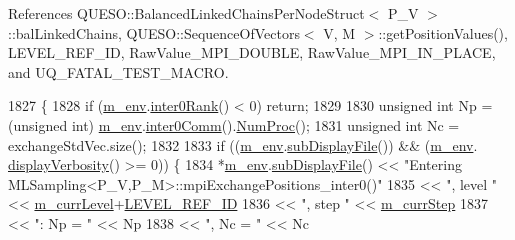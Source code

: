 References Q\-U\-E\-S\-O\-::\-Balanced\-Linked\-Chains\-Per\-Node\-Struct$<$ P\-\_\-\-V $>$\-::bal\-Linked\-Chains, Q\-U\-E\-S\-O\-::\-Sequence\-Of\-Vectors$<$ V, M $>$\-::get\-Position\-Values(), L\-E\-V\-E\-L\-\_\-\-R\-E\-F\-\_\-\-I\-D, Raw\-Value\-\_\-\-M\-P\-I\-\_\-\-D\-O\-U\-B\-L\-E, Raw\-Value\-\_\-\-M\-P\-I\-\_\-\-I\-N\-\_\-\-P\-L\-A\-C\-E, and U\-Q\-\_\-\-F\-A\-T\-A\-L\-\_\-\-T\-E\-S\-T\-\_\-\-M\-A\-C\-R\-O.


\begin{DoxyCode}
1827 \{
1828   \textcolor{keywordflow}{if} (\hyperlink{class_q_u_e_s_o_1_1_m_l_sampling_a13f1ca4fe9f94822fe572a743eaced1d}{m\_env}.\hyperlink{class_q_u_e_s_o_1_1_base_environment_ae106b5bb8a80b655b88b3a26b1e7c185}{inter0Rank}() < 0) \textcolor{keywordflow}{return};
1829 
1830   \textcolor{keywordtype}{unsigned} \textcolor{keywordtype}{int} Np = (\textcolor{keywordtype}{unsigned} int) \hyperlink{class_q_u_e_s_o_1_1_m_l_sampling_a13f1ca4fe9f94822fe572a743eaced1d}{m\_env}.\hyperlink{class_q_u_e_s_o_1_1_base_environment_a689e4d140c74d495d97eb498714a4b82}{inter0Comm}().\hyperlink{class_q_u_e_s_o_1_1_mpi_comm_aa780721ae0fdeabc5a15e04cb0cad964}{NumProc}();
1831   \textcolor{keywordtype}{unsigned} \textcolor{keywordtype}{int} Nc = exchangeStdVec.size();
1832 
1833   \textcolor{keywordflow}{if} ((\hyperlink{class_q_u_e_s_o_1_1_m_l_sampling_a13f1ca4fe9f94822fe572a743eaced1d}{m\_env}.\hyperlink{class_q_u_e_s_o_1_1_base_environment_a8a0064746ae8dddfece4229b9ad374d6}{subDisplayFile}()) && (\hyperlink{class_q_u_e_s_o_1_1_m_l_sampling_a13f1ca4fe9f94822fe572a743eaced1d}{m\_env}.
      \hyperlink{class_q_u_e_s_o_1_1_base_environment_a1fe5f244fc0316a0ab3e37463f108b96}{displayVerbosity}() >= 0)) \{
1834     *\hyperlink{class_q_u_e_s_o_1_1_m_l_sampling_a13f1ca4fe9f94822fe572a743eaced1d}{m\_env}.\hyperlink{class_q_u_e_s_o_1_1_base_environment_a8a0064746ae8dddfece4229b9ad374d6}{subDisplayFile}() << \textcolor{stringliteral}{"Entering
       MLSampling<P\_V,P\_M>::mpiExchangePositions\_inter0()"}
1835                             << \textcolor{stringliteral}{", level "} << \hyperlink{class_q_u_e_s_o_1_1_m_l_sampling_af9416874c856e50f3b35270e801f17e4}{m\_currLevel}+\hyperlink{_m_l_sampling_level_options_8h_a68d15eaf394d210effcf584b938206d3}{LEVEL\_REF\_ID}
1836                             << \textcolor{stringliteral}{", step "}  << \hyperlink{class_q_u_e_s_o_1_1_m_l_sampling_a1b1f8ccb4823bdfa26ec652f0807c63e}{m\_currStep}
1837                             << \textcolor{stringliteral}{": Np = "} << Np
1838                             << \textcolor{stringliteral}{", Nc = "} << Nc

\end{DoxyCode}

